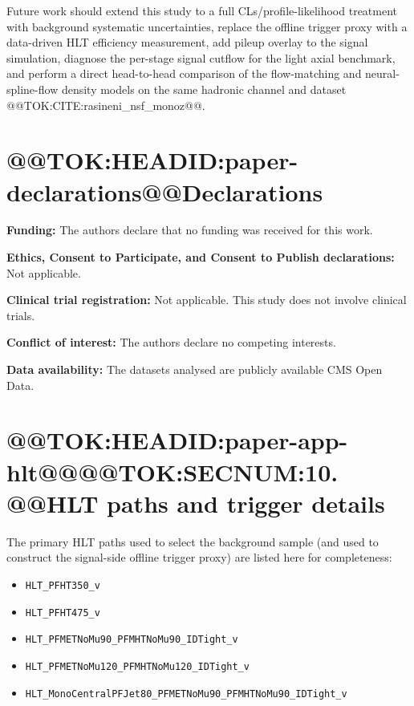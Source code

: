 \documentclass[11pt]{article}
\begin{document}
Future work should extend this study to a full CLs/profile-likelihood
treatment with background systematic uncertainties, replace the offline
trigger proxy with a data-driven HLT efficiency measurement, add pileup
overlay to the signal simulation, diagnose the per-stage signal cutflow for
the light axial benchmark, and perform a direct head-to-head comparison of
the flow-matching and neural-spline-flow density models on the same hadronic
channel and dataset @@TOK:CITE:rasineni_nsf_monoz@@.

\section*{@@TOK:HEADID:paper-declarations@@Declarations}


\noindent\textbf{Funding:} The authors declare that no funding was received for this work.

\noindent\textbf{Ethics, Consent to Participate, and Consent to Publish declarations:} Not applicable.

\noindent\textbf{Clinical trial registration:} Not applicable. This study does not involve clinical trials.

\noindent\textbf{Conflict of interest:} The authors declare no competing interests.

\noindent\textbf{Data availability:} The datasets analysed are publicly available CMS Open Data.




\appendix

\vspace{1em}

\section{@@TOK:HEADID:paper-app-hlt@@@@TOK:SECNUM:10. @@HLT paths and trigger details}

The primary HLT paths used to select the background sample (and used to
construct the signal-side offline trigger proxy) are listed here for
completeness:

\begin{itemize}
  \item \texttt{HLT\_PFHT350\_v}
  \item \texttt{HLT\_PFHT475\_v}
  \item \texttt{HLT\_PFMETNoMu90\_PFMHTNoMu90\_IDTight\_v}
  \item \texttt{HLT\_PFMETNoMu120\_PFMHTNoMu120\_IDTight\_v}
  \item \texttt{HLT\_MonoCentralPFJet80\_PFMETNoMu90\_PFMHTNoMu90\_IDTight\_v}
\end{itemize}
\end{document}
